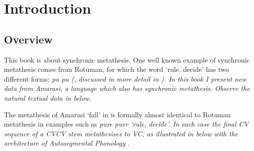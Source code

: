 \chapter{Introduction}

\section{Overview}
This book is about synchronic metathesis.
One well known example of synchronic metathesis comes
from Rotuman, for which the word `rule, decide'
has two different forms: \it{pu} {\tl} \it{pu}
(\citealp[14]{ch40}, discussed in more detail in ).
In this book I present new data from Amarasi,
a language which also has synchronic metathesis.
Observe the natural textual data in  below.

\begin{exe}
	\label{ex:130902-1, 1.43 ch:Intr}
	\begin{xlist}
	\end{xlist}
\end{exe}

The metathesis of Amarasi  {\tl}  `fall'
in  is formally almost identical to Rotuman
metathesis in examples such as \it{pure} {\tl} \it{puer} `rule, decide'.
In each case the final CV sequence of a CVCV stem metathesises to VC,
as illustrated in  below with
the architecture of Autosegmental Phonology \citep{go76}.

